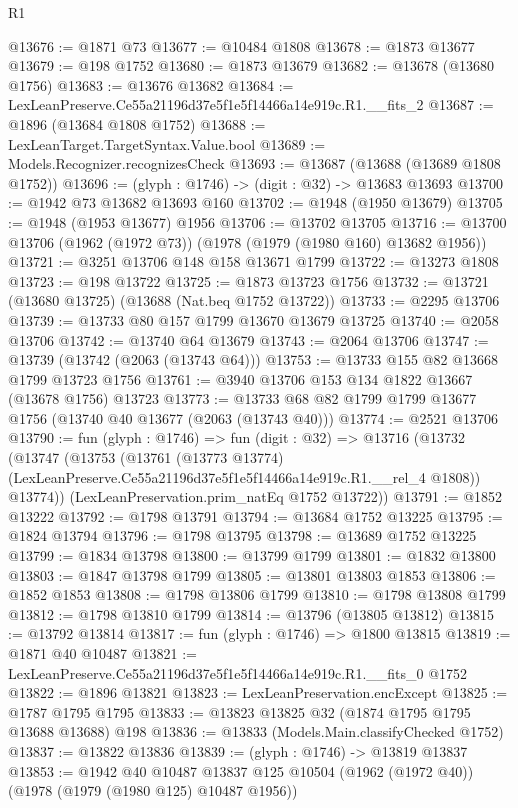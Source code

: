 \begin{lexlean}{R1}
\begin{coremodule}
@13676 := @1871 @73
@13677 := @10484 @1808
@13678 := @1873 @13677
@13679 := @198 @1752
@13680 := @1873 @13679
@13682 := @13678 (@13680 @1756)
@13683 := @13676 @13682
@13684 := LexLeanPreserve.Ce55a21196d37e5f1e5f14466a14e919c.R1.__fits_2
@13687 := @1896 (@13684 @1808 @1752)
@13688 := LexLeanTarget.TargetSyntax.Value.bool
@13689 := Models.Recognizer.recognizesCheck
@13693 := @13687 (@13688 (@13689 @1808 @1752))
@13696 := (glyph : @1746) -> (digit : @32) -> @13683 @13693
@13700 := @1942 @73 @13682 @13693 @160
@13702 := @1948 (@1950 @13679)
@13705 := @1948 (@1953 @13677) @1956
@13706 := @13702 @13705
@13716 := @13700 @13706 (@1962 (@1972 @73)) (@1978 (@1979 (@1980 @160) @13682 @1956))
@13721 := @3251 @13706 @148 @158 @13671 @1799
@13722 := @13273 @1808
@13723 := @198 @13722
@13725 := @1873 @13723 @1756
@13732 := @13721 (@13680 @13725) (@13688 (Nat.beq @1752 @13722))
@13733 := @2295 @13706
@13739 := @13733 @80 @157 @1799 @13670 @13679 @13725
@13740 := @2058 @13706
@13742 := @13740 @64 @13679
@13743 := @2064 @13706
@13747 := @13739 (@13742 (@2063 (@13743 @64)))
@13753 := @13733 @155 @82 @13668 @1799 @13723 @1756
@13761 := @3940 @13706 @153 @134 @1822 @13667 (@13678 @1756) @13723
@13773 := @13733 @68 @82 @1799 @1799 @13677 @1756 (@13740 @40 @13677 (@2063 (@13743 @40)))
@13774 := @2521 @13706
@13790 := fun (glyph : @1746) =>
  fun (digit : @32) =>
  @13716
    (@13732
      (@13747
        (@13753
          (@13761
            (@13773 @13774)
            (LexLeanPreserve.Ce55a21196d37e5f1e5f14466a14e919c.R1.__rel_4 @1808))
          @13774))
      (LexLeanPreservation.prim_natEq @1752 @13722))
@13791 := @1852 @13222
@13792 := @1798 @13791
@13794 := @13684 @1752 @13225
@13795 := @1824 @13794
@13796 := @1798 @13795
@13798 := @13689 @1752 @13225
@13799 := @1834 @13798
@13800 := @13799 @1799
@13801 := @1832 @13800
@13803 := @1847 @13798 @1799
@13805 := @13801 @13803 @1853
@13806 := @1852 @1853
@13808 := @1798 @13806 @1799
@13810 := @1798 @13808 @1799
@13812 := @1798 @13810 @1799
@13814 := @13796 (@13805 @13812)
@13815 := @13792 @13814
@13817 := fun (glyph : @1746) => @1800 @13815
@13819 := @1871 @40 @10487
@13821 := LexLeanPreserve.Ce55a21196d37e5f1e5f14466a14e919c.R1.__fits_0 @1752
@13822 := @1896 @13821
@13823 := LexLeanPreservation.encExcept
@13825 := @1787 @1795 @1795
@13833 := @13823 @13825 @32 (@1874 @1795 @1795 @13688 @13688) @198
@13836 := @13833 (Models.Main.classifyChecked @1752)
@13837 := @13822 @13836
@13839 := (glyph : @1746) -> @13819 @13837
@13853 := @1942
    @40
    @10487
    @13837
    @125
    @10504
    (@1962 (@1972 @40))
    (@1978 (@1979 (@1980 @125) @10487 @1956))

\end{coremodule}
\end{lexlean}
